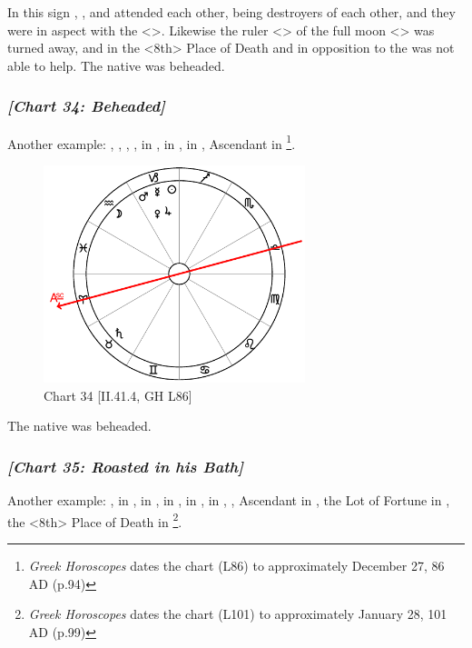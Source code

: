 In this sign \Saturn, \Mercury, and \Mars\xspace attended each other, being destroyers of each other, and they were in aspect with the \Moon\xspace <\Square>. Likewise the ruler <\Saturn> of the full moon <\Capricorn> was turned away, and \Jupiter\xspace in the <8th> Place of Death and in opposition to the \Sun\xspace was not able to help. The native was beheaded.
\newpage
\subsubsection{\textit{[Chart 34: Beheaded]}}
Another example: \Sun, \Mercury, \Mars, \Jupiter, \Venus\xspace in \Capricorn, \Moon\xspace in \Aquarius, \Saturn\xspace in \Taurus, Ascendant in \Aries
\footnote{\textit{Greek Horoscopes} dates the chart (L86) to approximately December 27, 86 AD (p.94)}.

\clearpage
\begin{figure}
\centering
\vspace{-20pt}
\includegraphics[width=0.68\textwidth]{charts/2_41_4}
\caption{Chart 34 [II.41.4, GH L86]}
\label{fig:chart34}
\end{figure} 

The native was beheaded.
\newpage
\subsubsection{\textit{[Chart 35: Roasted in his Bath]}}
Another example: \Sun, \Venus\xspace in \Aquarius, \Moon\xspace in \Gemini, \Saturn\xspace in \Scorpio, \Jupiter\xspace in \Pisces, \Mars\xspace in \Cancer, \Mercury, Ascendant in \Capricorn, the Lot of Fortune in \Virgo, the <8th> Place of Death in \Aries
\footnote{\textit{Greek Horoscopes} dates the chart (L101) to approximately January 28, 101 AD (p.99)}.

